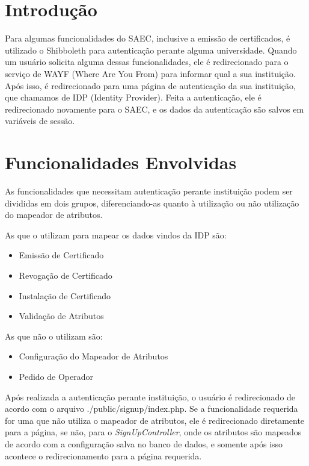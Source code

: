 
\section{Introdução}

Para algumas funcionalidades do SAEC, inclusive a emissão de certificados, é utilizado o Shibboleth para autenticação perante alguma universidade. Quando um usuário solicita alguma dessas funcionalidades, ele é redirecionado para o serviço de WAYF (Where Are You From) para informar qual a sua instituição. Após isso, é redirecionado para uma página de autenticação da sua instituição, que chamamos de IDP (Identity Provider). Feita a autenticação, ele é redirecionado novamente para o SAEC, e os dados da autenticação são salvos em variáveis de sessão.


\section{Funcionalidades Envolvidas}

As funcionalidades que necessitam autenticação perante instituição podem ser divididas em dois grupos, diferenciando-as quanto à utilização ou não utilização do mapeador de atributos.

As que o utilizam para mapear os dados vindos da IDP são:
\begin{itemize}
    \item Emissão de Certificado
    \item Revogação de Certificado
    \item Instalação de Certificado
    \item Validação de Atributos
\end{itemize}

As que não o utilizam são:
\begin{itemize}
        \item Configuração do Mapeador de Atributos
        \item Pedido de Operador
\end{itemize}

Após realizada a autenticação perante instituição, o usuário é redirecionado de acordo com o arquivo ./public/signup/index.php. Se a funcionalidade requerida for uma que não utiliza o mapeador de atributos, ele é redirecionado diretamente para a página, se não, para o \textit{SignUpController}, onde os atributos são mapeados de acordo com a configuração salva no banco de dados, e somente após isso acontece o redirecionamento para a página requerida.